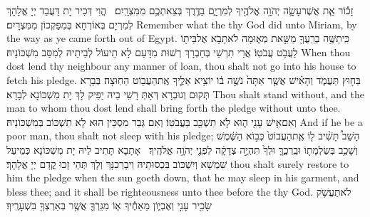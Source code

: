 {זָכ֕וֹר אֵ֧ת אֲשֶׁר\maqqaf עָשָׂ֛ה יְהֹוָ֥ה אֱלֹהֶ֖יךָ לְמִרְיָ֑ם בַּדֶּ֖רֶךְ בְּצֵאתְכֶ֥ם מִמִּצְרָֽיִם׃ \setuma }
{הֱוִי דְּכִיר יָת דַּעֲבַד יְיָ אֱלָהָךְ לְמִרְיָם בְּאוֹרְחָא בְּמִפַּקְכוֹן מִמִּצְרָיִם׃}
{Remember what the \lord\space thy God did unto Miriam, by the way as ye came forth out of Egypt.}{}
{כִּֽי\maqqaf תַשֶּׁ֥ה בְרֵֽעֲךָ֖ מַשַּׁ֣את מְא֑וּמָה לֹא\maqqaf תָבֹ֥א אֶל\maqqaf בֵּית֖וֹ לַעֲבֹ֥ט עֲבֹטֽוֹ׃}
{אֲרֵי תִרְשֵׁי בְּחַבְרָךְ רְשׁוּת מִדָּעַם לָא תֵיעוֹל לְבֵיתֵיהּ לְמִסַּב מִשְׁכּוֹנֵיהּ׃}
{When thou dost lend thy neighbour any manner of loan, thou shalt not go into his house to fetch his pledge.}{}
{בַּח֖וּץ תַּעֲמֹ֑ד וְהָאִ֗ישׁ אֲשֶׁ֤ר אַתָּה֙ נֹשֶׁ֣ה ב֔וֹ יוֹצִ֥יא אֵלֶ֛יךָ אֶֽת\maqqaf הַעֲב֖וֹט הַחֽוּצָה׃}
{בְּבָרָא תְּקוּם וְגוּבְרָא דְּאַתְּ רָשֵׁי בֵיהּ יַפֵּיק לָךְ יָת מִשְׁכּוֹנָא לְבָרָא׃}
{Thou shalt stand without, and the man to whom thou dost lend shall bring forth the pledge without unto thee.}{}
{וְאִם\maqqaf אִ֥ישׁ עָנִ֖י ה֑וּא לֹ֥א תִשְׁכַּ֖ב בַּעֲבֹטֽוֹ׃}
{וְאִם גְּבַר מִסְכֵּין הוּא לָא תִשְׁכּוֹב בְּמִשְׁכּוֹנֵיהּ׃}
{And if he be a poor man, thou shalt not sleep with his pledge;}{}
{הָשֵׁב֩ תָּשִׁ֨יב ל֤וֹ אֶֽת\maqqaf הַעֲבוֹט֙ כְּב֣וֹא הַשֶּׁ֔מֶשׁ וְשָׁכַ֥ב בְּשַׂלְמָת֖וֹ וּבֵֽרְכֶ֑ךָּ וּלְךָ֙ תִּהְיֶ֣ה צְדָקָ֔ה לִפְנֵ֖י יְהֹוָ֥ה אֱלֹהֶֽיךָ׃ \setuma }
{אָתָבָא תָּתִיב לֵיהּ יָת מִשְׁכּוֹנָא כְּמֵיעַל שִׁמְשָׁא וְיִשְׁכּוֹב בִּכְסוּתֵיהּ וִיבָרְכִנָּךְ וְלָךְ תְּהֵי זָכוּ קֳדָם יְיָ אֱלָהָךְ׃}
{thou shalt surely restore to him the pledge when the sun goeth down, that he may sleep in his garment, and bless thee; and it shall be righteousness unto thee before the \lord\space thy God.}{}
{לֹא\maqqaf תַעֲשֹׁ֥ק שָׂכִ֖יר עָנִ֣י וְאֶבְי֑וֹן מֵאַחֶ֕יךָ א֧וֹ מִגֵּרְךָ֛ אֲשֶׁ֥ר בְּאַרְצְךָ֖ בִּשְׁעָרֶֽיךָ׃}
